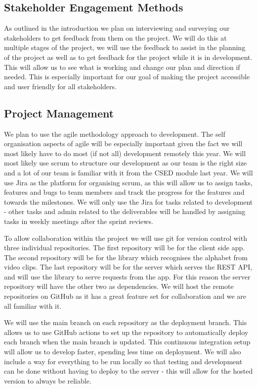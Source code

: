 \documentclass[10pt]{article}
\begin{document}
\subsection{Stakeholder Engagement Methods}

As outlined in the introduction we plan on interviewing and surveying our stakeholders to get 
feedback from them on the project. We will do this at multiple stages of the project, we will use 
the feedback to assist in the planning of the project as well as to get feedback for the project 
while it is in development. This will allow us to see what is working and change our plan and 
direction if needed. This is especially important for our goal of making the project accessible and 
user friendly for all stakeholders.

\subsection{Project Management}

We plan to use the agile methodology approach to development. The self organisation aspects of agile 
will be especially important given the fact we will most likely have to do most (if not all) 
development remotely this year. We will most likely use scrum to structure our development as our 
team is the right size and a lot of our team is familiar with it from the CSED module last year.  We 
will use Jira as the platform for organising scrum, as this will allow us to assign tasks, features 
and bugs to team members and track the progress for the features and towards the milestones. We will 
only use the Jira for tasks related to development - other tasks and admin related to the 
deliverables will be handled by assigning tasks in weekly meetings after the sprint reviews.

To allow collaboration within the project we will use git for version control with three individual 
repositories. The first repository will be for the client side app. The second repository will be 
for the library which recognises the alphabet from video clips. The last repository will be for the 
server which serves the REST API, and will use the library to serve requests from the app. For this 
reason the server repository will have the other two as dependencies. We will host the remote 
repositories on GitHub as it has a great feature set for collaboration and we are all familiar with 
it.

We will use the main branch on each repository as the deployment branch. This allows us to use 
GitHub actions to set up the repository to automatically deploy each branch when the main branch is 
updated. This continuous integration setup will allow us to develop faster, spending less time on 
deployment. We will also include a way for everything to be run locally so that testing and 
development can be done without having to deploy to the server - this will allow for the hosted 
version to always be reliable.
\end{document}
